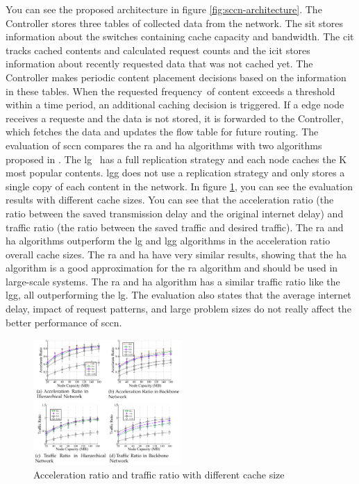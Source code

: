 \documentclass[conference]{IEEEtran}
\begin{document}
	You can see the proposed architecture in figure \ref{fig:sccn-architecture}. The Controller stores three tables of collected data from the network. The \ac{sit} stores information about the switches containing cache capacity and bandwidth. The \ac{cit} tracks cached contents and calculated request counts and the \ac{icit} stores information about recently requested data that was not cached yet. The Controller makes periodic content placement decisions based on the information in these tables. When the requested frequency of content exceeds a threshold within a time period, an additional caching decision is triggered. 
	If a edge node receives a requeste and the data is not stored, it is forwarded to the Controller, which fetches the data and updates the flow table for future routing. The evaluation of \ac{sccn} compares the \ac{ra} and \ac{ha} algorithms with two algorithms proposed in \cite{caching-8}. The \ac{lg}  has a full replication strategy and each node caches the K most popular contents. \ac{lgg} does not use a replication strategy and only stores a single copy of each content in the network.
	In figure \ref{fig:sccn-result}, you can see the evaluation results with different cache sizes. You can see that the acceleration ratio (the ratio between the saved transmission delay and the original internet delay) and traffic ratio (the ratio between the saved traffic and desired traffic). The \ac{ra} and \ac{ha} algorithms outperform the \ac{lg} and \ac{lgg} algorithms in the acceleration ratio overall cache sizes. The \ac{ra} and \ac{ha} have very similar results, showing that the \ac{ha} algorithm is a good approximation for the \ac{ra} algorithm and should be used in large-scale systems. The \ac{ra} and \ac{ha} algorithm has a similar traffic ratio like the \ac{lgg}, all outperforming the \ac{lg}. The evaluation also states that the average internet delay, impact of request patterns, and large problem sizes do not really affect the better performance of \ac{sccn}.

	\begin{figure}
		\centering
		\includegraphics[width=0.5\textwidth]{figures/sccn-result.png}
		\caption{Acceleration ratio and traffic ratio with different cache size \cite{caching-7}}
		\label{fig:sccn-result}
	\end{figure}
\end{document}
